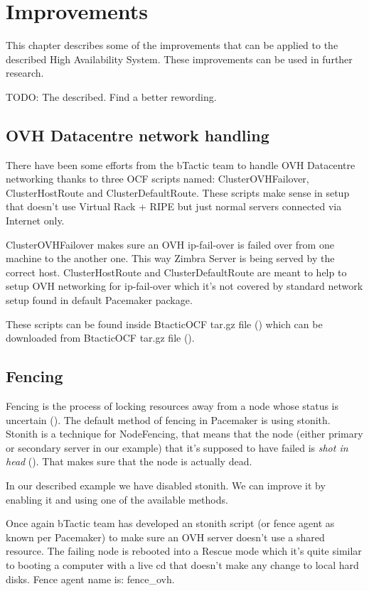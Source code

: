 

\chapter{Improvements}
\label{chap:improvements}
This chapter describes some of the improvements that can be applied to the described High Availability System. These improvements can be used in further research.

TODO: The described. Find a better rewording.

\section {OVH Datacentre network handling}
There have been some efforts from the bTactic team to handle OVH Datacentre networking thanks to three OCF scripts named: 
ClusterOVHFailover, ClusterHostRoute and ClusterDefaultRoute. These scripts make sense in setup that doesn't use Virtual Rack + RIPE but just normal servers connected via Internet only.

ClusterOVHFailover makes sure an OVH ip-fail-over is failed over from one machine to the another one. This way Zimbra Server is being served by the correct host.
ClusterHostRoute and ClusterDefaultRoute are meant to help to setup OVH networking for ip-fail-over which it's not covered by standard network setup found in  default Pacemaker package.

These scripts can be found inside BtacticOCF tar.gz file (\cite{BtacticOCF}) which can be downloaded from BtacticOCF  tar.gz file (\cite{BtacticOrg}).

\section {Fencing}
Fencing is the process of locking resources away from a node whose status is uncertain (\cite{LinuxHAFencing}). The default method of fencing in Pacemaker is using stonith. Stonith is a technique for NodeFencing, that means that the node (either primary or secondary server in our example) that it's supposed to have failed is \textit{shot in head} (\cite{LinuxHAStonith}). That makes sure that the node is actually dead.

In our described example we have disabled stonith. We can improve it by enabling it and using one of the available methods.

Once again bTactic team has developed an stonith script (or fence agent as known per Pacemaker) to make sure an OVH server doesn't use a shared resource. The failing node is rebooted into a Rescue mode which it's quite similar to booting a computer with a live cd that doesn't make any change to local hard disks. Fence agent name is: fence\_ovh.

